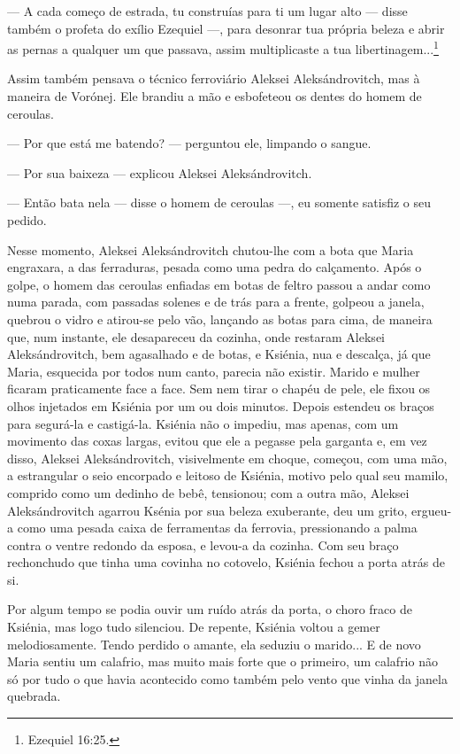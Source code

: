 --- A cada começo de estrada, tu construías para ti um lugar alto ---
disse também o profeta do exílio Ezequiel ---, para desonrar tua própria
beleza e abrir as pernas a qualquer um que passava, assim multiplicaste
a tua libertinagem...\footnote{Ezequiel 16:25.}

Assim também pensava o técnico ferroviário Aleksei Aleksándrovitch, mas
à maneira de Vorónej. Ele brandiu a mão e esbofeteou os dentes do homem
de ceroulas.

--- Por que está me batendo? --- perguntou ele, limpando o sangue.

--- Por sua baixeza --- explicou Aleksei Aleksándrovitch.

--- Então bata nela --- disse o homem de ceroulas ---, eu somente
satisfiz o seu pedido.

Nesse momento, Aleksei Aleksándrovitch chutou-lhe com a bota que Maria
engraxara, a das ferraduras, pesada como uma pedra do calçamento. Após o
golpe, o homem das ceroulas enfiadas em botas de feltro passou a andar
como numa parada, com passadas solenes e de trás para a frente, golpeou
a janela, quebrou o vidro e atirou-se pelo vão, lançando as botas para
cima, de maneira que, num instante, ele desapareceu da cozinha, onde
restaram Aleksei Aleksándrovitch, bem agasalhado e de botas, e Ksiénia,
nua e descalça, já que Maria, esquecida por todos num canto, parecia não
existir. Marido e mulher ficaram praticamente face a face. Sem nem tirar
o chapéu de pele, ele fixou os olhos injetados em Ksiénia por um ou dois
minutos. Depois estendeu os braços para segurá-la e castigá-la. Ksiénia
não o impediu, mas apenas, com um movimento das coxas largas, evitou que
ele a pegasse pela garganta e, em vez disso, Aleksei Aleksándrovitch,
visivelmente em choque, começou, com uma mão, a estrangular o seio
encorpado e leitoso de Ksiénia, motivo pelo qual seu mamilo, comprido
como um dedinho de bebê, tensionou; com a outra mão, Aleksei
Aleksándrovitch agarrou Ksénia por sua beleza exuberante, deu um grito,
ergueu-a como uma pesada caixa de ferramentas da ferrovia, pressionando
a palma contra o ventre redondo da esposa, e levou-a da cozinha. Com seu
braço rechonchudo que tinha uma covinha no cotovelo, Ksiénia fechou a
porta atrás de si.

Por algum tempo se podia ouvir um ruído atrás da porta, o choro fraco de
Ksiénia, mas logo tudo silenciou. De repente, Ksiénia voltou a gemer
melodiosamente. Tendo perdido o amante, ela seduziu o marido... E de
novo Maria sentiu um calafrio, mas muito mais forte que o primeiro, um
calafrio não só por tudo o que havia acontecido como também pelo vento
que vinha da janela quebrada.

